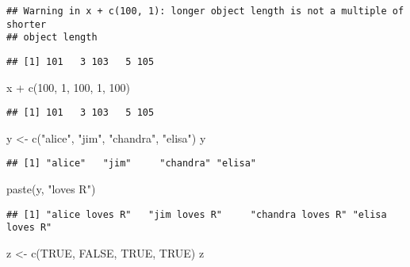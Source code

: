 \documentclass[
]{article}
\newenvironment{Shaded}{\begin{snugshade}}{\end{snugshade}}
\newcommand{\ConstantTok}[1]{\textcolor[rgb]{0.00,0.00,0.00}{#1}}
\newcommand{\DecValTok}[1]{\textcolor[rgb]{0.00,0.00,0.81}{#1}}
\newcommand{\FunctionTok}[1]{\textcolor[rgb]{0.00,0.00,0.00}{#1}}
\newcommand{\NormalTok}[1]{#1}
\newcommand{\OtherTok}[1]{\textcolor[rgb]{0.56,0.35,0.01}{#1}}
\newcommand{\SpecialCharTok}[1]{\textcolor[rgb]{0.00,0.00,0.00}{#1}}
\newcommand{\StringTok}[1]{\textcolor[rgb]{0.31,0.60,0.02}{#1}}
\begin{document}
\begin{verbatim}
## Warning in x + c(100, 1): longer object length is not a multiple of shorter
## object length
\end{verbatim}

\begin{verbatim}
## [1] 101   3 103   5 105
\end{verbatim}

\begin{Shaded}
\begin{Highlighting}[]
\NormalTok{x }\SpecialCharTok{+} \FunctionTok{c}\NormalTok{(}\DecValTok{100}\NormalTok{, }\DecValTok{1}\NormalTok{, }\DecValTok{100}\NormalTok{, }\DecValTok{1}\NormalTok{, }\DecValTok{100}\NormalTok{)}
\end{Highlighting}
\end{Shaded}

\begin{verbatim}
## [1] 101   3 103   5 105
\end{verbatim}

\begin{Shaded}
\begin{Highlighting}[]
\NormalTok{y }\OtherTok{\textless{}{-}}  \FunctionTok{c}\NormalTok{(}\StringTok{"alice"}\NormalTok{, }\StringTok{"jim"}\NormalTok{, }\StringTok{"chandra"}\NormalTok{, }\StringTok{"elisa"}\NormalTok{)}
\NormalTok{y}
\end{Highlighting}
\end{Shaded}

\begin{verbatim}
## [1] "alice"   "jim"     "chandra" "elisa"
\end{verbatim}

\begin{Shaded}
\begin{Highlighting}[]
\FunctionTok{paste}\NormalTok{(y, }\StringTok{"loves R"}\NormalTok{)}
\end{Highlighting}
\end{Shaded}

\begin{verbatim}
## [1] "alice loves R"   "jim loves R"     "chandra loves R" "elisa loves R"
\end{verbatim}

\begin{Shaded}
\begin{Highlighting}[]
\NormalTok{z }\OtherTok{\textless{}{-}}  \FunctionTok{c}\NormalTok{(}\ConstantTok{TRUE}\NormalTok{, }\ConstantTok{FALSE}\NormalTok{, }\ConstantTok{TRUE}\NormalTok{, }\ConstantTok{TRUE}\NormalTok{)}
\NormalTok{z}
\end{Highlighting}
\end{Shaded}
\end{document}

